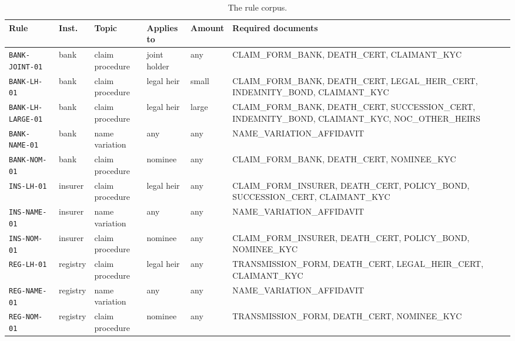 \documentclass[12pt,a4paper,oneside]{report}
\begin{document}
\begin{table}[H]
\centering\small{}
\caption{The rule corpus.}\label{tab:rules}
\renewcommand{\arraystretch}{1.15}
\begin{tabularx}{\linewidth}{@{}p{3.3cm}p{1.2cm}p{1.6cm}p{1.5cm}p{1.1cm}X@{}}
\toprule
\textbf{Rule} & \textbf{Inst.} & \textbf{Topic} & \textbf{Applies to} & \textbf{Amount} & \textbf{Required documents} \\ \midrule
\texttt{BANK-JOINT-01} & bank & claim procedure & joint holder & any & \scriptsize CLAIM\_FORM\_BANK, DEATH\_CERT, CLAIMANT\_KYC \\
\texttt{BANK-LH-01} & bank & claim procedure & legal heir & small & \scriptsize CLAIM\_FORM\_BANK, DEATH\_CERT, LEGAL\_HEIR\_CERT, INDEMNITY\_BOND, CLAIMANT\_KYC \\
\texttt{BANK-LH-LARGE-01} & bank & claim procedure & legal heir & large & \scriptsize CLAIM\_FORM\_BANK, DEATH\_CERT, SUCCESSION\_CERT, INDEMNITY\_BOND, CLAIMANT\_KYC, NOC\_OTHER\_HEIRS \\
\texttt{BANK-NAME-01} & bank & name variation & any & any & \scriptsize NAME\_VARIATION\_AFFIDAVIT \\
\texttt{BANK-NOM-01} & bank & claim procedure & nominee & any & \scriptsize CLAIM\_FORM\_BANK, DEATH\_CERT, NOMINEE\_KYC \\
\texttt{INS-LH-01} & insurer & claim procedure & legal heir & any & \scriptsize CLAIM\_FORM\_INSURER, DEATH\_CERT, POLICY\_BOND, SUCCESSION\_CERT, CLAIMANT\_KYC \\
\texttt{INS-NAME-01} & insurer & name variation & any & any & \scriptsize NAME\_VARIATION\_AFFIDAVIT \\
\texttt{INS-NOM-01} & insurer & claim procedure & nominee & any & \scriptsize CLAIM\_FORM\_INSURER, DEATH\_CERT, POLICY\_BOND, NOMINEE\_KYC \\
\texttt{REG-LH-01} & registry & claim procedure & legal heir & any & \scriptsize TRANSMISSION\_FORM, DEATH\_CERT, LEGAL\_HEIR\_CERT, CLAIMANT\_KYC \\
\texttt{REG-NAME-01} & registry & name variation & any & any & \scriptsize NAME\_VARIATION\_AFFIDAVIT \\
\texttt{REG-NOM-01} & registry & claim procedure & nominee & any & \scriptsize TRANSMISSION\_FORM, DEATH\_CERT, NOMINEE\_KYC \\

\bottomrule
\end{tabularx}
\end{table}
\end{document}
